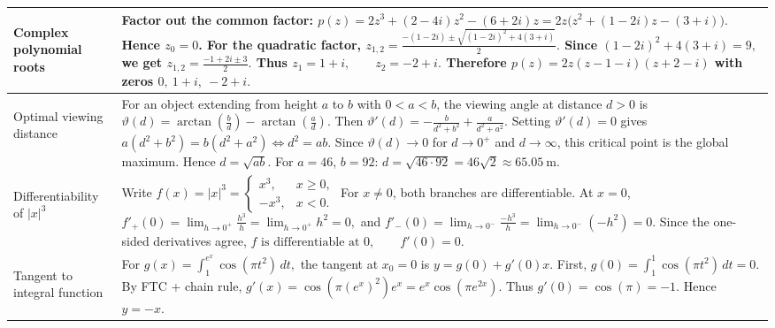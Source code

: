 {\begin{minipage}[t]{0.495\textwidth}
\begin{tabular}{
    @{}
    >{\bfseries\raggedright\arraybackslash}p{3.0cm}
    >{\raggedright\arraybackslash}p{10.4cm}
    @{}
}
\midrule

Complex polynomial roots &
Factor out the common factor:
$
p(z)
=
2z^3+(2-4i)z^2-(6+2i)z
=
2z\bigl(z^2+(1-2i)z-(3+i)\bigr).
$
Hence $z_0=0$. For the quadratic factor,
$
z_{1,2}
=
\frac{-(1-2i)\pm
\sqrt{(1-2i)^2+4(3+i)}}{2}.
$
Since
$
(1-2i)^2+4(3+i)=9,
$
we get
$
z_{1,2}
=
\frac{-1+2i\pm3}{2}.
$
Thus
$
z_1=1+i,
\qquad
z_2=-2+i.
$
Therefore
$
\boxed{
p(z)=2z(z-1-i)(z+2-i)
}
$
with zeros
$
\boxed{0,\ 1+i,\ -2+i}.
$
\\

\midrule

Optimal viewing distance &
For an object extending from height $a$ to $b$ with $0<a<b$, the viewing angle at distance $d>0$ is
$
\vartheta(d)
=
\arctan\!\left(\frac{b}{d}\right)
-
\arctan\!\left(\frac{a}{d}\right).
$
Then
$
\vartheta'(d)
=
-\frac{b}{d^2+b^2}
+
\frac{a}{d^2+a^2}.
$
Setting $\vartheta'(d)=0$ gives
$
a(d^2+b^2)=b(d^2+a^2)
\Longleftrightarrow
d^2=ab.
$
Since $\vartheta(d)\to0$ for $d\to0^+$ and $d\to\infty$, this critical point is the global maximum. Hence
$
\boxed{d=\sqrt{ab}}.
$
For $a=46$, $b=92$:
$
\boxed{d=\sqrt{46\cdot92}=46\sqrt2\approx65.05\ \mathrm m}.
$
\\

\midrule

Differentiability of $|x|^3$ &
Write
$
f(x)=|x|^3=
\begin{cases}
x^3,&x\ge0,\\
-x^3,&x<0.
\end{cases}
$
For $x\neq0$, both branches are differentiable. At $x=0$,
$
f'_+(0)
=
\lim_{h\to0^+}\frac{h^3}{h}
=
\lim_{h\to0^+}h^2
=
0,
$
and
$
f'_-(0)
=
\lim_{h\to0^-}\frac{-h^3}{h}
=
\lim_{h\to0^-}(-h^2)
=
0.
$
Since the one-sided derivatives agree,
$
\boxed{f\text{ is differentiable at }0,\qquad f'(0)=0}.
$
\\

\midrule

Tangent to integral function &
For
$
g(x)=\int_{1}^{e^x}\cos(\pi t^2)\,dt,
$
the tangent at $x_0=0$ is
$
y=g(0)+g'(0)x.
$
First,
$
g(0)=\int_1^1\cos(\pi t^2)\,dt=0.
$
By FTC + chain rule,
$
g'(x)
=
\cos\!\left(\pi(e^x)^2\right)e^x
=
e^x\cos(\pi e^{2x}).
$
Thus
$
g'(0)=\cos(\pi)=-1.
$
Hence
$
\boxed{y=-x}.
$
\\

\bottomrule
\end{tabular}

\end{minipage}
}